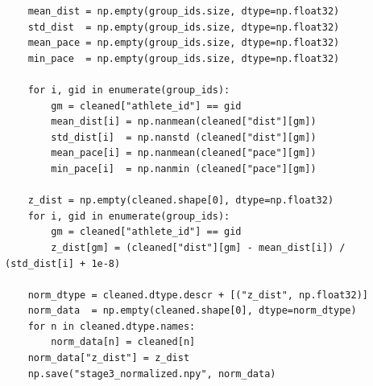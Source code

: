 \documentclass[oneside,a4paper,14pt]{extarticle}
\begin{document}
\begin{verbatim}
    mean_dist = np.empty(group_ids.size, dtype=np.float32)
    std_dist  = np.empty(group_ids.size, dtype=np.float32)
    mean_pace = np.empty(group_ids.size, dtype=np.float32)
    min_pace  = np.empty(group_ids.size, dtype=np.float32)

    for i, gid in enumerate(group_ids):
        gm = cleaned["athlete_id"] == gid
        mean_dist[i] = np.nanmean(cleaned["dist"][gm])
        std_dist[i]  = np.nanstd (cleaned["dist"][gm])
        mean_pace[i] = np.nanmean(cleaned["pace"][gm])
        min_pace[i]  = np.nanmin (cleaned["pace"][gm])

    z_dist = np.empty(cleaned.shape[0], dtype=np.float32)
    for i, gid in enumerate(group_ids):
        gm = cleaned["athlete_id"] == gid
        z_dist[gm] = (cleaned["dist"][gm] - mean_dist[i]) / (std_dist[i] + 1e-8)

    norm_dtype = cleaned.dtype.descr + [("z_dist", np.float32)]
    norm_data  = np.empty(cleaned.shape[0], dtype=norm_dtype)
    for n in cleaned.dtype.names:
        norm_data[n] = cleaned[n]
    norm_data["z_dist"] = z_dist
    np.save("stage3_normalized.npy", norm_data)
\end{verbatim}
\end{document}
